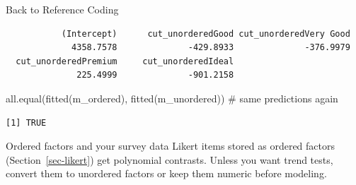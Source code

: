 \documentclass[
  ignorenonframetext,
  aspectratio=169,
]{beamer}
\newenvironment{Shaded}{\begin{snugshade}}{\end{snugshade}}
\newcommand{\AttributeTok}[1]{\textcolor[rgb]{0.40,0.45,0.13}{#1}}
\newcommand{\CommentTok}[1]{\textcolor[rgb]{0.37,0.37,0.37}{#1}}
\newcommand{\ConstantTok}[1]{\textcolor[rgb]{0.56,0.35,0.01}{#1}}
\newcommand{\FunctionTok}[1]{\textcolor[rgb]{0.28,0.35,0.67}{#1}}
\newcommand{\NormalTok}[1]{\textcolor[rgb]{0.00,0.23,0.31}{#1}}
\newcommand{\OtherTok}[1]{\textcolor[rgb]{0.00,0.23,0.31}{#1}}
\newcommand{\SpecialCharTok}[1]{\textcolor[rgb]{0.37,0.37,0.37}{#1}}
\begin{document}
\begin{frame}[fragile]{Back to Reference Coding}
\protect\hypertarget{back-to-reference-coding}{}
\begin{Shaded}
\end{Shaded}

\begingroup\tiny\color{darkgray}

\begin{verbatim}
           (Intercept)      cut_unorderedGood cut_unorderedVery Good 
             4358.7578              -429.8933              -376.9979 
  cut_unorderedPremium     cut_unorderedIdeal 
              225.4999              -901.2158 
\end{verbatim}

\endgroup

\begin{Shaded}
\begin{Highlighting}[]
\FunctionTok{all.equal}\NormalTok{(}\FunctionTok{fitted}\NormalTok{(m\_ordered), }\FunctionTok{fitted}\NormalTok{(m\_unordered))   }\CommentTok{\# same predictions again}
\end{Highlighting}
\end{Shaded}

\begingroup\tiny\color{darkgray}

\begin{verbatim}
[1] TRUE
\end{verbatim}

\endgroup

\begin{alertblock}{Ordered factors and your survey data}
\protect\hypertarget{ordered-factors-and-your-survey-data}{}
Likert items stored as ordered factors (Section~\ref{sec-likert}) get
polynomial contrasts. Unless you want trend tests, convert them to
unordered factors or keep them numeric before modeling.
\end{alertblock}
\end{frame}
\end{document}
